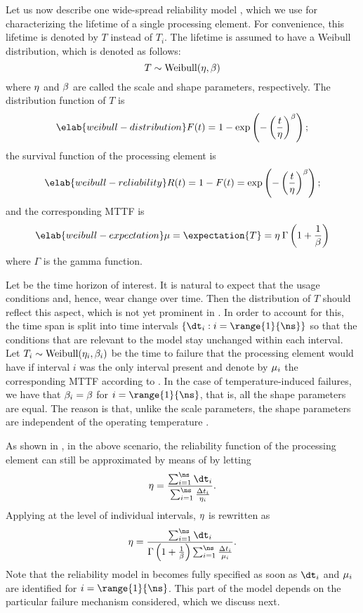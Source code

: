 Let us now describe one wide-spread reliability model \cite{huang2009b,
xiang2010}, which we use for characterizing the lifetime of a single processing
element. For convenience, this lifetime is denoted by $T$ instead of $T_i$. The
lifetime is assumed to have a Weibull distribution, which is denoted as follows:
\[
  T \sim \mathrm{Weibull}(\eta, \beta)
\]
where $\eta$ and $\beta$ are called the scale and shape parameters,
respectively. The distribution function of $T$ is
\begin{equation} \elab{weibull-distribution}
  F(t) = 1 - \exp\left(-\left(\frac{t}{\scale}\right)^\shape\right);
\end{equation}
the survival function of the processing element is
\begin{equation} \elab{weibull-reliability}
  R(t) = 1 - F(t) = \exp\left(-\left(\frac{t}{\scale}\right)^\shape\right);
\end{equation}
and the corresponding \ac{MTTF} is
\begin{equation} \elab{weibull-expectation}
  \mean = \expectation{T} = \scale \: \Gamma\left(1 + \frac{1}{\shape}\right)
\end{equation}
where $\Gamma$ is the gamma function.

Let \period be the time horizon of interest. It is natural to expect that the
usage conditions and, hence, wear change over time. Then the distribution of $T$
should reflect this aspect, which is not yet prominent in
. In order to account for this, the time span is
split into \ns time intervals $\{ \dt_i: i = \range{1}{\ns} \}$ so that the
conditions that are relevant to the model stay unchanged within each interval.
Let $T_i \sim \mathrm{Weibull}(\eta_i, \beta_i)$ be the time to failure that
the processing element would have if interval $i$ was the only interval present
and denote by $\mu_i$ the corresponding \ac{MTTF} according to
. In the case of temperature-induced failures, we have
that $\beta_i = \beta$ for $i = \range{1}{\ns}$, that is, all the shape
parameters are equal. The reason is that, unlike the scale parameters, the shape
parameters are independent of the operating temperature \cite{chang2006}.

As shown in \cite{xiang2010}, in the above scenario, the reliability function of
the processing element can still be approximated by means of
 by letting
\[
  \scale = \frac{\sum_{i = 1}^\ns \dt_i}{\sum_{i = 1}^\ns \frac{\Delta t_i}{\scale_i}}.
\]
Applying  at the level of individual intervals,
$\eta$ is rewritten as
\[
  \scale = \frac{\sum_{i = 1}^\ns \dt_i}{\Gamma\left(1 + \frac{1}{\shape}\right) \sum_{i = 1}^\ns \frac{\Delta t_i}{\mean_i}}.
\]
Note that the reliability model in  becomes fully
specified as soon as $\dt_i$ and $\mu_i$ are identified for $i =
\range{1}{\ns}$. This part of the model depends on the particular failure
mechanism considered, which we discuss next.

